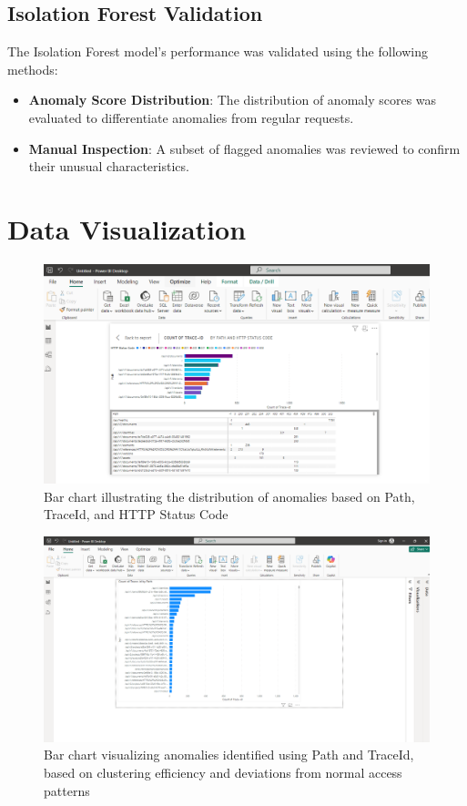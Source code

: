 \subsection{Isolation Forest Validation}
The Isolation Forest model's performance was validated using the following methods:
\begin{itemize}
	\item \textbf{Anomaly Score Distribution}: The distribution of anomaly scores was evaluated to differentiate anomalies from regular requests.
	\item \textbf{Manual Inspection}: A subset of flagged anomalies was reviewed to confirm their unusual characteristics.
\end{itemize}


\section{Data Visualization}

\begin{figure}
	\begin{center}
		\includegraphics[width=0.7\linewidth]{Images/PowerBI1.png}
		\caption{Bar chart illustrating the distribution of anomalies based on Path, TraceId, and HTTP Status Code}
		\label{PowerBI1} 
	\end{center}
\end{figure}

\begin{figure}
	\begin{center}
		\includegraphics[width=0.7\linewidth]{Images/PowerBI2.png}
		\caption{Bar chart visualizing anomalies identified using Path and TraceId, based on clustering efficiency and deviations from normal access patterns}
		\label{PowerBI2} 
	\end{center}
\end{figure}

